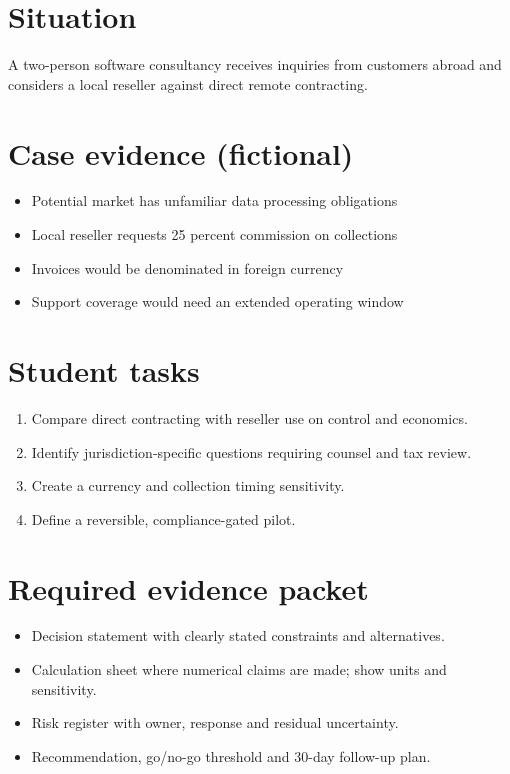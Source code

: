 \documentclass[11pt]{article}
\begin{document}
\SuiteOpen
\section{Situation}
A two-person software consultancy receives inquiries from customers abroad and considers a local reseller against direct remote contracting.
\section{Case evidence (fictional)}
\begin{itemize}[leftmargin=*,itemsep=3pt]
\item Potential market has unfamiliar data processing obligations
\item Local reseller requests 25 percent commission on collections
\item Invoices would be denominated in foreign currency
\item Support coverage would need an extended operating window
\end{itemize}

\section{Student tasks}
\begin{enumerate}[leftmargin=*,itemsep=5pt]
\item Compare direct contracting with reseller use on control and economics.
\item Identify jurisdiction-specific questions requiring counsel and tax review.
\item Create a currency and collection timing sensitivity.
\item Define a reversible, compliance-gated pilot.
\end{enumerate}

\section{Required evidence packet}
\begin{itemize}[leftmargin=*,itemsep=3pt]
\item Decision statement with clearly stated constraints and alternatives.
\item Calculation sheet where numerical claims are made; show units and sensitivity.
\item Risk register with owner, response and residual uncertainty.
\item Recommendation, go/no-go threshold and 30-day follow-up plan.
\end{itemize}
\end{document}
